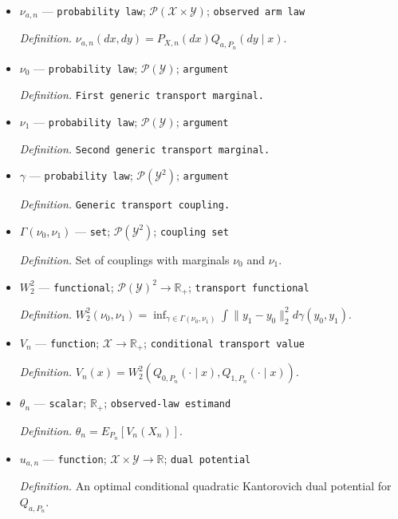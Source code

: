 \documentclass{article}
\begin{document}
\begin{itemize}
  \par\smallskip\noindent\emph{Definition.} \(\mu_{a,P_n}(\cdot\mid x)=\mathcal L_{P_n}(Y_n(a)\mid X_n=x)\).
  \item \(\nu_{a,n}\) --- \texttt{probability law}; \(\mathcal P(\mathcal X\times\mathcal Y)\); \texttt{observed arm law}
  \par\smallskip\noindent\emph{Definition.} \(\nu_{a,n}(dx,dy)=P_{X,n}(dx)Q_{a,P_n}(dy\mid x)\).
  \item \(\nu_0\) --- \texttt{probability law}; \(\mathcal P(\mathcal Y)\); \texttt{argument}
  \par\smallskip\noindent\emph{Definition.} \texttt{First generic transport marginal.}
  \item \(\nu_1\) --- \texttt{probability law}; \(\mathcal P(\mathcal Y)\); \texttt{argument}
  \par\smallskip\noindent\emph{Definition.} \texttt{Second generic transport marginal.}
  \item \(\gamma\) --- \texttt{probability law}; \(\mathcal P(\mathcal Y^2)\); \texttt{argument}
  \par\smallskip\noindent\emph{Definition.} \texttt{Generic transport coupling.}
  \item \(\Gamma(\nu_0,\nu_1)\) --- \texttt{set}; \(\mathcal P(\mathcal Y^2)\); \texttt{coupling set}
  \par\smallskip\noindent\emph{Definition.} Set of couplings with marginals \(\nu_0\) and \(\nu_1\).
  \item \(W_2^2\) --- \texttt{functional}; \(\mathcal P(\mathcal Y)^2\to\mathbb R_+\); \texttt{transport functional}
  \par\smallskip\noindent\emph{Definition.} \(W_2^2(\nu_0,\nu_1)=\inf_{\gamma\in\Gamma(\nu_0,\nu_1)}\int\lVert y_1-y_0\rVert_2^2d\gamma(y_0,y_1)\).
  \item \(V_n\) --- \texttt{function}; \(\mathcal X\to\mathbb R_+\); \texttt{conditional transport value}
  \par\smallskip\noindent\emph{Definition.} \(V_n(x)=W_2^2(Q_{0,P_n}(\cdot\mid x),Q_{1,P_n}(\cdot\mid x))\).
  \item \(\theta_n\) --- \texttt{scalar}; \(\mathbb R_+\); \texttt{observed-\allowbreak{}law estimand}
  \par\smallskip\noindent\emph{Definition.} \(\theta_n=E_{P_n}[V_n(X_n)]\).
  \item \(u_{a,n}\) --- \texttt{function}; \(\mathcal X\times\mathcal Y\to\mathbb R\); \texttt{dual potential}
  \par\smallskip\noindent\emph{Definition.} An optimal conditional quadratic Kantorovich dual potential for \(Q_{a,P_n}\).

\end{itemize}
\end{document}

